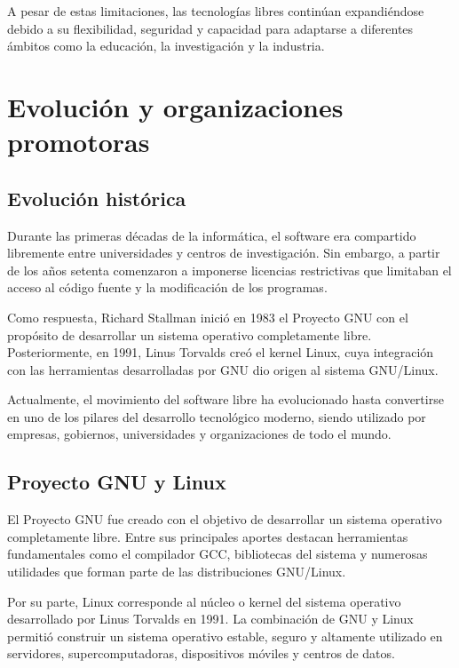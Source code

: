 \documentclass[12pt]{article}
\begin{document}
	A pesar de estas limitaciones, las tecnologías libres continúan expandiéndose debido a su flexibilidad, seguridad y capacidad para adaptarse a diferentes ámbitos como la educación, la investigación y la industria.
	
	\section{Evolución y organizaciones promotoras}
	
	\subsection{Evolución histórica}
	
	Durante las primeras décadas de la informática, el software era compartido libremente entre universidades y centros de investigación. Sin embargo, a partir de los años setenta comenzaron a imponerse licencias restrictivas que limitaban el acceso al código fuente y la modificación de los programas.
	
	Como respuesta, Richard Stallman inició en 1983 el Proyecto GNU con el propósito de desarrollar un sistema operativo completamente libre. Posteriormente, en 1991, Linus Torvalds creó el kernel Linux, cuya integración con las herramientas desarrolladas por GNU dio origen al sistema GNU/Linux.
	
	Actualmente, el movimiento del software libre ha evolucionado hasta convertirse en uno de los pilares del desarrollo tecnológico moderno, siendo utilizado por empresas, gobiernos, universidades y organizaciones de todo el mundo.
	
	\subsection{Proyecto GNU y Linux}
	
	El Proyecto GNU fue creado con el objetivo de desarrollar un sistema operativo completamente libre. Entre sus principales aportes destacan herramientas fundamentales como el compilador GCC, bibliotecas del sistema y numerosas utilidades que forman parte de las distribuciones GNU/Linux.
	
	Por su parte, Linux corresponde al núcleo o kernel del sistema operativo desarrollado por Linus Torvalds en 1991. La combinación de GNU y Linux permitió construir un sistema operativo estable, seguro y altamente utilizado en servidores, supercomputadoras, dispositivos móviles y centros de datos.
	
\end{document}
